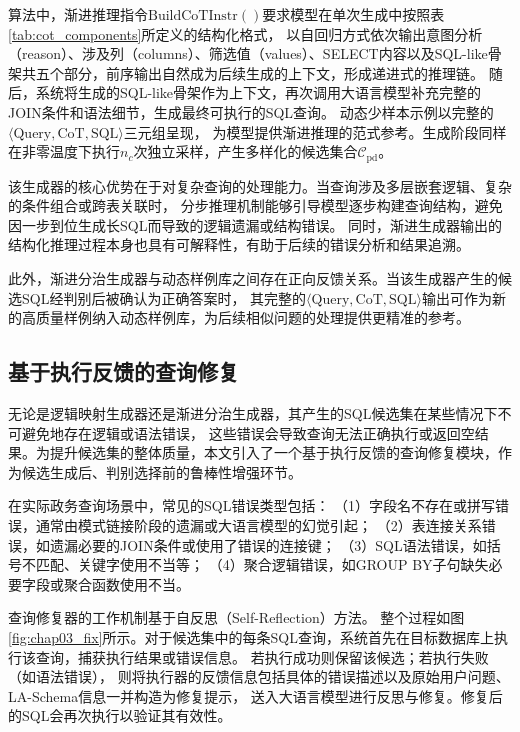 算法中，渐进推理指令$\text{BuildCoTInstr}()$要求模型在单次生成中按照表\ref{tab:cot_components}所定义的结构化格式，
以自回归方式依次输出意图分析（reason）、涉及列（columns）、筛选值（values）、SELECT内容以及SQL-like骨架共五个部分，前序输出自然成为后续生成的上下文，形成递进式的推理链。
随后，系统将生成的SQL-like骨架作为上下文，再次调用大语言模型补充完整的JOIN条件和语法细节，生成最终可执行的SQL查询。
动态少样本示例以完整的$\langle \text{Query}, \text{CoT}, \text{SQL} \rangle$三元组呈现，
为模型提供渐进推理的范式参考。生成阶段同样在非零温度下执行$n_c$次独立采样，产生多样化的候选集合$\mathcal{C}_{\text{pd}}$。

该生成器的核心优势在于对复杂查询的处理能力。当查询涉及多层嵌套逻辑、复杂的条件组合或跨表关联时，
分步推理机制能够引导模型逐步构建查询结构，避免因一步到位生成长SQL而导致的逻辑遗漏或结构错误。
同时，渐进生成器输出的结构化推理过程本身也具有可解释性，有助于后续的错误分析和结果追溯。

此外，渐进分治生成器与动态样例库之间存在正向反馈关系。当该生成器产生的候选SQL经判别后被确认为正确答案时，
其完整的$\langle \text{Query}, \text{CoT}, \text{SQL} \rangle$输出可作为新的高质量样例纳入动态样例库，为后续相似问题的处理提供更精准的参考。

\subsection{基于执行反馈的查询修复}\label{subsec:query_repair}

无论是逻辑映射生成器还是渐进分治生成器，其产生的SQL候选集在某些情况下不可避免地存在逻辑或语法错误\cite{pourreza2024chase,talaei2024chess}，
这些错误会导致查询无法正确执行或返回空结果。为提升候选集的整体质量，本文引入了一个基于执行反馈的查询修复模块，作为候选生成后、判别选择前的鲁棒性增强环节。

在实际政务查询场景中，常见的SQL错误类型包括：
（1）字段名不存在或拼写错误，通常由模式链接阶段的遗漏或大语言模型的幻觉引起；
（2）表连接关系错误，如遗漏必要的JOIN条件或使用了错误的连接键；
（3）SQL语法错误，如括号不匹配、关键字使用不当等；
（4）聚合逻辑错误，如GROUP BY子句缺失必要字段或聚合函数使用不当。

查询修复器的工作机制基于自反思（Self-Reflection）方法\cite{shinn2024reflexion}。
整个过程如图\ref{fig:chap03_fix}所示。对于候选集中的每条SQL查询，系统首先在目标数据库上执行该查询，捕获执行结果或错误信息。
若执行成功则保留该候选；若执行失败（如语法错误），
则将执行器的反馈信息包括具体的错误描述以及原始用户问题、LA-Schema信息一并构造为修复提示，
送入大语言模型进行反思与修复。修复后的SQL会再次执行以验证其有效性。


